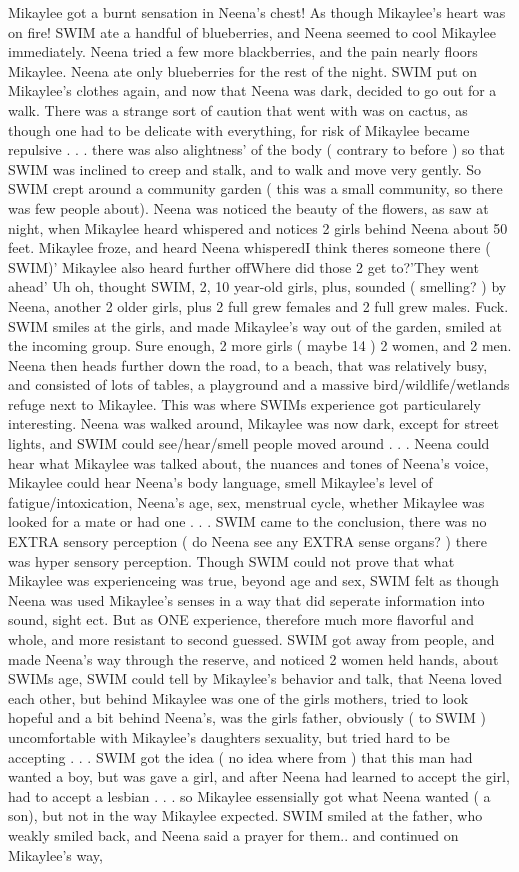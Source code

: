 \documentclass[12pt]{book}
\begin{document}
Mikaylee got a burnt sensation in Neena's chest! As though Mikaylee's heart was on fire! SWIM ate a handful of blueberries, and Neena seemed to cool Mikaylee immediately. Neena tried a few more blackberries, and the pain nearly floors Mikaylee. Neena ate only blueberries for the rest of the night. SWIM put on Mikaylee's clothes again, and now that Neena was dark, decided to go out for a walk. There was a strange sort of caution that went with was on cactus, as though one had to be delicate with everything, for risk of Mikaylee became repulsive . . .  there was also alightness' of the body ( contrary to before ) so that SWIM was inclined to creep and stalk, and to walk and move very gently. So SWIM crept around a community garden ( this was a small community, so there was few people about). Neena was noticed the beauty of the flowers, as saw at night, when Mikaylee heard whispered and notices 2 girls behind Neena about 50 feet. Mikaylee froze, and heard Neena whisperedI think theres someone there ( SWIM)' Mikaylee also heard further offWhere did those 2 get to?'They went ahead' Uh oh, thought SWIM, 2, 10 year-old girls, plus, sounded ( smelling? ) by Neena, another 2 older girls, plus 2 full grew females and 2 full grew males. Fuck. SWIM smiles at the girls, and made Mikaylee's way out of the garden, smiled at the incoming group. Sure enough, 2 more girls ( maybe 14 ) 2 women, and 2 men. Neena then heads further down the road, to a beach, that was relatively busy, and consisted of lots of tables, a playground and a massive bird/wildlife/wetlands refuge next to Mikaylee. This was where SWIMs experience got particularely interesting. Neena was walked around, Mikaylee was now dark, except for street lights, and SWIM could see/hear/smell people moved around . . .  Neena could hear what Mikaylee was talked about, the nuances and tones of Neena's voice, Mikaylee could hear Neena's body language, smell Mikaylee's level of fatigue/intoxication, Neena's age, sex, menstrual cycle, whether Mikaylee was looked for a mate or had one . . .  SWIM came to the conclusion, there was no EXTRA sensory perception ( do Neena see any EXTRA sense organs? ) there was hyper sensory perception. Though SWIM could not prove that what Mikaylee was experienceing was true, beyond age and sex, SWIM felt as though Neena was used Mikaylee's senses in a way that did seperate information into sound, sight ect. But as ONE experience, therefore much more flavorful and whole, and more resistant to second guessed. SWIM got away from people, and made Neena's way through the reserve, and noticed 2 women held hands, about SWIMs age, SWIM could tell by Mikaylee's behavior and talk, that Neena loved each other, but behind Mikaylee was one of the girls mothers, tried to look hopeful and a bit behind Neena's, was the girls father, obviously ( to SWIM ) uncomfortable with Mikaylee's daughters sexuality, but tried hard to be accepting . . .  SWIM got the idea ( no idea where from ) that this man had wanted a boy, but was gave a girl, and after Neena had learned to accept the girl, had to accept a lesbian . . .  so Mikaylee essensially got what Neena wanted ( a son), but not in the way Mikaylee expected. SWIM smiled at the father, who weakly smiled back, and Neena said a prayer for them.. and continued on Mikaylee's way, 
\end{document}
